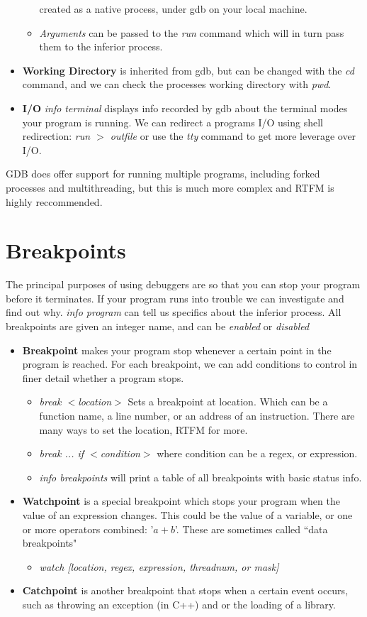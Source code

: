 \documentclass{article}
\begin{document}
\begin{itemize}
\begin{itemize}
					created as a native process, under gdb on your local machine.
				\item \textit{Arguments} can be passed to the \textit{run} command which will in turn pass them to 
					the inferior process.
			\end{itemize}
		\item \textbf{Working Directory} is inherited from gdb, but can be changed with the \textit{cd} command, and we
			can check the processes working directory with \textit{pwd}.
		\item \textbf{I/O} \textit{info terminal} displays info recorded by gdb about the terminal modes your 
			program is running. We can redirect a programs I/O using shell redirection: \textit{run $>$ outfile} 
			or use the \textit{tty} command to get more leverage over I/O.
	\end{itemize}
	GDB does offer support for running multiple programs, including forked processes and multithreading, but this is much
	more complex and RTFM is highly reccommended.
\newpage
\section*{Breakpoints}
	The principal purposes of using debuggers are so that you can stop your program before it terminates. If your program
	runs into trouble we can investigate and find out why. \textit{info program} can tell us specifics about the inferior process.
	All breakpoints are given an integer name, and can be \textit{enabled} or \textit{disabled}
	\begin{itemize}
		\item \textbf{Breakpoint} makes your program stop whenever a certain point in the program is reached. For each
			breakpoint, we can add conditions to control in finer detail whether a program stops.
			\begin{itemize}
				\item \textit{break $<$location$>$} Sets a breakpoint at location. Which can be a function name, a
					line number, or an address of an instruction. There are many ways to set the location, RTFM for more.
				\item \textit{break ... if $<$condition$>$} where condition can be a regex, or expression.
				\item \textit{info breakpoints} will print a table of all breakpoints with basic status info.
			\end{itemize}
		\item \textbf{Watchpoint} is a special breakpoint which stops your program when the value of an expression changes.
			This could be the value of a variable, or one or more operators combined: '$a + b$'. These are sometimes
			called ``data breakpoints"
			\begin{itemize}
				\item \textit{watch [location, regex, expression, threadnum, or mask] }
			\end{itemize}
		\item \textbf{Catchpoint} is another breakpoint that stops when a certain event occurs, such as throwing an exception
			(in C++) and or the loading of a library.

	\end{itemize}
\end{document}
